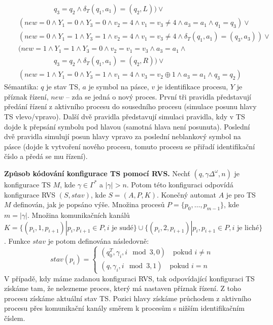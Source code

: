 \documentclass[a4paper,12pt]{article}
\begin{document}
\begin{enumerate}[label=\textbf{\arabic*}.]
\begin{itemize}
\begin{eqnarray*}
    &&\quad\quad\quad\quad\quad q_3 = q_2 \wedge \delta_T(q_1, a_1) = (q_2, L)) \vee \\
    &&(new = 0  \wedge Y_1 = 0 \wedge Y_3 = 0 \wedge v_2 = 4 \wedge v_1 = v_3 \neq 4 \wedge a_3 = a_1 \wedge q_1 = q_3) \vee \\
    &&(new = 0  \wedge Y_1 = 1 \wedge Y_3 = 1 \wedge v_2 = 4 \wedge v_1 = v_3 \neq 4 \wedge \delta_T(q_1, a_1) = (q_3, a_3)) \vee \\
    && (new = 1  \wedge Y_1 = 1 \wedge Y_3 = 0 \wedge v_2 = v_1 = v_3 \wedge a_3 = a_1\wedge \\
      &&\quad\quad\quad\quad\quad q_3 = q_2 \wedge \delta_T(q_1, a_1) = (q_2, R)) \vee \\
    && (new = 1  \wedge Y_1 = 0 \wedge Y_3 = 1 \wedge v_1 = 4 \wedge v_3 = v_2 \oplus 1 \wedge a_3 = a_1 \wedge q_3 = q_2)
  \end{eqnarray*}
  Sémantika: $q$ je stav TS, $a$ je symbol na pásce, $v$ je identifikace procesu, $Y$ je příznak řízení, $new$ -- zda se jedná o nový proces. 
  První tři pravidla představují předání řízení z aktivního procesu do sousedního procesu (simulace posunu hlavy TS vlevo/vpravo). Další dvě pravidla
  představují simulaci pravidla, kdy v TS dojde k přepsání symbolu pod hlavou (samotná hlava není posunuta). Poslední dvě pravidla
  simulují posun hlavy vpravo za poslední neblankový symbol na pásce (dojde k vytvoření nového procesu, tomuto procesu se přiřadí identifikační číslo
  a předá se mu řízení).
 \end{itemize}
 
 \textbf{Způsob kódování konfigurace TS pomocí RVS.} Nechť $(q, \gamma\Delta^{\omega}, n)$ je konfigurace TS $M$, kde $\gamma\in\Gamma^*$ a $|\gamma| > n$. Potom této konfiguraci odpovídá konfigurace RVS $(S, stav)$,
 kde $S = (A, P, K)$. Konečný automat $A$ je pro TS $M$ definován, jak je popsáno výše. Množina procesů $P = \{p_0, \dots, p_{m-1}\}$, kde $m = |\gamma|$.
 Množina komunikačních kanálů $K = \{(p_i, 1, p_{i+1})| p_i, p_{i+1}\in P, i \mbox{ je sudé}\}\cup \{(p_i, 2, p_{i+1})| p_i, p_{i+1}\in P, i\mbox{ je liché}\}$.
 Funkce $stav$ je potom definována následovně:
 $$
  stav(p_i) = \begin{cases} (q^T_0, \gamma_i, i\mod 3, 0)\quad\mbox{pokud } i\neq n\\ (q, \gamma_i, i\mod 3, 1)\quad\mbox{pokud } i= n \end{cases}
 $$
 V případě, kdy máme zadanou konfiguraci RVS, tak odpovídající konfiguraci TS získáme tam, že nelezneme proces, který má nastaven příznak řízení. 
 Z toho procesu získáme aktuální stav TS. Pozici hlavy získáme průchodem z aktivního procesu přes komunikační kanály směrem k procesům s nižším identifikačním číslem.
 

\end{enumerate}
\end{document}
